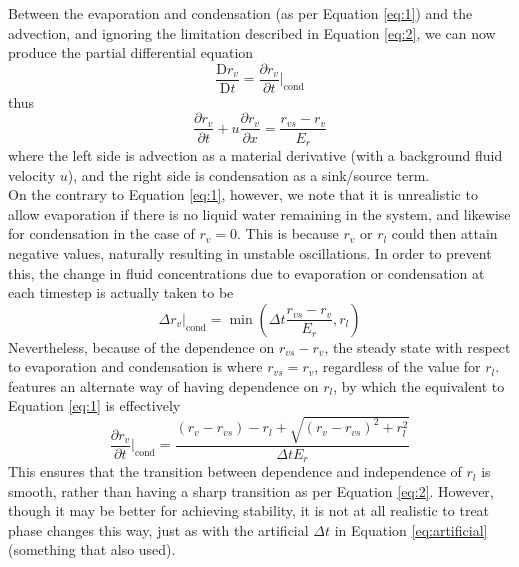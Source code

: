 \documentclass[11pt]{article}
\begin{document}
Between the evaporation and condensation (as per Equation \ref{eq:1}) and the advection, and ignoring the limitation described in Equation \ref{eq:2}, we can now produce the partial differential equation
\[
\frac{\text{D} r_v}{\text{D} t}=\frac{\partial r_v}{\partial t}|_{\text{cond}}
\]
thus
\begin{equation}
\frac{\partial r_v}{\partial t}+u\frac{\partial r_v}{\partial x}=\frac{r_{vs} - r_v}{E_r} \label{eq:3}
\end{equation}
where the left side is advection as a material derivative (with a background fluid velocity $u$), and the right side is condensation as a sink/source term. \\
On the contrary to Equation \ref{eq:1}, however, we note that it is unrealistic to allow evaporation if there is no liquid water remaining in the system, and likewise for condensation in the case of $r_v=0$. This is because $r_v$ or $r_l$ could then attain negative values, naturally resulting in unstable oscillations. In order to prevent this, the change in fluid concentrations due to evaporation or condensation at each timestep is actually taken to be
\begin{equation} \label{eq:2}
\Delta r_v|_{\text{cond}} = \min\left(\Delta t\frac{r_{vs} - r_v}{E_r},r_l\right)
\end{equation}
Nevertheless, because of the dependence on $r_{vs} - r_v$, the steady state with respect to evaporation and condensation is where $r_{vs}=r_v$, regardless of the value for $r_l$. \\
\citet[p.~324]{Jaehn2015} features an alternate way of having dependence on $r_l$, by which the equivalent to Equation \ref{eq:1} is effectively
\begin{equation} \label{eq:jaehn}
\frac{\partial r_v}{\partial t}|_{\text{cond}} = \frac{\left(r_v-r_{vs}\right)-r_l+\sqrt{\left(r_v-r_{vs}\right)^2+r_l^2}}{\Delta t E_r}
\end{equation}
This ensures that the transition between dependence and independence of $r_l$ is smooth, rather than having a sharp transition as per Equation \ref{eq:2}. However, though it may be better for achieving stability, it is not at all realistic to treat phase changes this way, just as with the artificial $\Delta t$ in Equation \ref{eq:artificial} (something that \citeauthor{Jaehn2015} also used).
\end{document}
